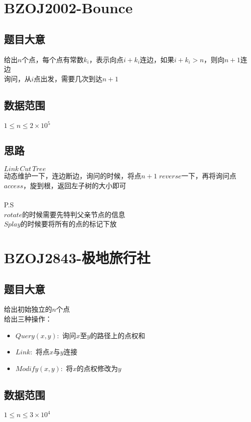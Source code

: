 \documentclass{ctexart}
\numberwithin{equation}{section}
\begin{document}
\begin{flushleft}
  \section{BZOJ2002-Bounce}
  \subsection{题目大意}
  给出$n$个点，每个点有常数$k_i$，表示向点$i+k_i$连边，如果$i+k_i>n$，则向$n+1$连边\\
  询问，从$i$点出发，需要几次到达$n+1$\\
  \subsection{数据范围}
  $1\le n \le 2\times 10^5$
  \subsection{思路}
  $Link\, Cut\, Tree$\\
  动态维护一下，连边断边，询问的时候，将点$n+1\; reverse$一下，再将询问点$access$，旋到根，返回左子树的大小即可\\

  ~\\

  P.S\\
  $rotate$的时候需要先特判父亲节点的信息\\
  $Splay$的时候要将所有的点的标记下放\\
  \newpage

  \section{BZOJ2843-极地旅行社}
  \subsection{题目大意}
  给出初始独立的$n$个点\\
  给出三种操作：\\
  \begin{itemize}
  \item $Query(x,y):$ 询问$x$至$y$的路径上的点权和
  \item $Link:$ 将点$x$与$y$连接
  \item $Modify(x, y):$ 将$x$的点权修改为$y$
  \end{itemize}
  \subsection{数据范围}
  $1\le n \le 3\times 10^4$

\end{flushleft}
\end{document}
